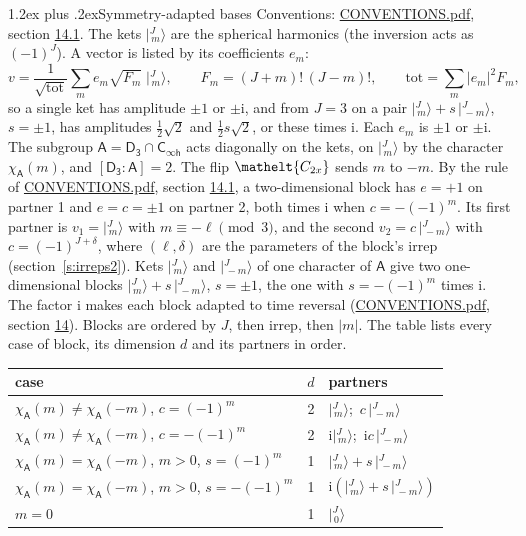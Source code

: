 \documentclass[10pt,a4paper]{article}
\makeatletter
\renewcommand\section{\@startsection{section}{1}{\z@}{-3ex plus -1ex minus -.2ex}%
  {1.2ex plus .2ex}{\normalfont\large\sffamily\bfseries\color{parttitle}}}
\numberwithin{equation}{section}
\newcommand{\eltfont}[1]{{\let\sigma\eltsigma\mathelt{#1}}}
\newcommand{\grp}[1]{\mathsf{#1}}
\newcommand{\elt}[1]{\eltfont{#1}}
\newcommand{\grpindex}[2]{[#1 : #2]}
\newcommand{\iunit}{\mathrm{i}}
\newcommand{\chiA}{\chi_{\grp{A}}}
\newcommand{\jm}[2]{\bigl\lvert{}^{#1}_{\,#2}\bigr\rangle}
\makeatother
\begin{document}
\section{Symmetry-adapted bases}\label{s:bases}
Conventions: \href{../../CONVENTIONS.pdf}{CONVENTIONS.pdf}, section \href{../../CONVENTIONS.pdf\#conv.14.1}{14.1}.
\leavevmode\label{n:index.m}\label{n:vector.ket}The kets $\jm{J}{m}$ are the spherical harmonics (the inversion acts as $(-1)^J$). \label{n:index.ketcoefficient}\label{n:vector.basis.symmetry}\label{n:index.ketweight}\label{n:index.total}A vector is listed by its coefficients $e_m$:
\begin{equation}\label{e:ket}v = \frac{1}{\sqrt{\mathrm{tot}}}\sum_m e_m\sqrt{F_m}\;\jm{J}{m},\qquad F_m = (J+m)!\,(J-m)!,\qquad \mathrm{tot} = \sum_m |e_m|^2F_m,\end{equation}
\leavevmode\label{n:index.pair.sign}so a single ket has amplitude $\pm1$ or $\pm\iunit$, and from $J = 3$ on a pair $\jm{J}{m} + s\,\jm{J}{-m}$, $s = \pm1$, has amplitudes $\tfrac{1}{2}\sqrt{2}$ and $\tfrac{1}{2}s\sqrt{2}$, or these times $\iunit$. Each $e_m$ is $\pm1$ or $\pm\iunit$.
\leavevmode\label{n:group.A}\label{n:function.character.abelian}The subgroup $\grp{A} = \grp{D_{3}}\cap\grp{C_{\infty h}}$ acts diagonally on the kets, on $\jm{J}{m}$ by the character $\chiA(m)$, and $\grpindex{\grp{D_{3}}}{\grp{A}} = 2$. The flip $\elt{C_{2x}}$ sends $m$ to $-m$. \label{n:index.partner.sign}By the rule of \href{../../CONVENTIONS.pdf}{CONVENTIONS.pdf}, section \href{../../CONVENTIONS.pdf\#conv.14.1}{14.1}, a two-dimensional block has $e = +1$ on partner 1 and $e = c = \pm1$ on partner 2, both times $\iunit$ when $c = -(-1)^m$. Its first partner is $v_1 = \jm{J}{m}$ with $m \equiv -\ell \pmod{3}$, and the second $v_2 = c\,\jm{J}{-m}$ with $c = (-1)^{J+\delta}$, where $(\ell, \delta)$ are the parameters of the block's irrep (section~\ref{s:irreps2}). Kets $\jm{J}{m}$ and $\jm{J}{-m}$ of one character of $\grp{A}$ give two one-dimensional blocks $\jm{J}{m} + s\,\jm{J}{-m}$, $s = \pm1$, the one with $s = -(-1)^m$ times $\iunit$. The factor $\iunit$ makes each block adapted to time reversal (\href{../../CONVENTIONS.pdf}{CONVENTIONS.pdf}, section \href{../../CONVENTIONS.pdf\#conv.14}{14}). Blocks are ordered by $J$, then irrep, then $|m|$.
\leavevmode\label{n:head.case}\label{n:head.partners}The table lists every case of block, its dimension $d$ and its partners in order.
\begin{center}\begin{tabular}{@{}lrl@{}}\toprule
case & $d$ & partners\\\midrule
$\chiA(m) \ne \chiA(-m)$, $c = (-1)^m$ & 2 & $\jm{J}{m}$;\ $c\,\jm{J}{-m}$\\
$\chiA(m) \ne \chiA(-m)$, $c = -(-1)^m$ & 2 & $\iunit\jm{J}{m}$;\ $\iunit c\,\jm{J}{-m}$\\
$\chiA(m) = \chiA(-m)$, $m > 0$, $s = (-1)^m$ & 1 & $\jm{J}{m} + s\,\jm{J}{-m}$\\
$\chiA(m) = \chiA(-m)$, $m > 0$, $s = -(-1)^m$ & 1 & $\iunit(\jm{J}{m} + s\,\jm{J}{-m})$\\
$m = 0$ & 1 & $\jm{J}{0}$\\
\bottomrule\end{tabular}\end{center}
\end{document}
